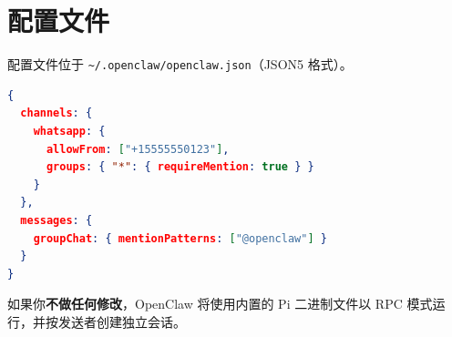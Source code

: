 \section{配置文件}

配置文件位于 \texttt{\textasciitilde{}/.openclaw/openclaw.json}（JSON5 格式）。

\begin{lstlisting}[language=json]
{
  channels: {
    whatsapp: {
      allowFrom: ["+15555550123"],
      groups: { "*": { requireMention: true } }
    }
  },
  messages: {
    groupChat: { mentionPatterns: ["@openclaw"] }
  }
}
\end{lstlisting}

如果你\textbf{不做任何修改}，OpenClaw 将使用内置的 Pi 二进制文件以 RPC 模式运行，并按发送者创建独立会话。
